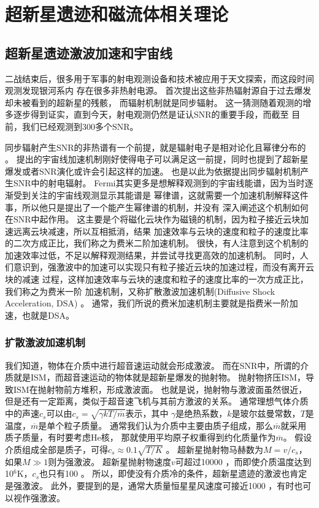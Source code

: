 \chapter{超新星遗迹和磁流体相关理论}
\label{Theory}

\section{超新星遗迹激波加速和宇宙线}
\label{TheoryDSACR}
二战结束后，很多用于军事的射电观测设备和技术被应用于天文探索，而这段时间观测发现银河系内
存在很多非热射电源。
\citet{1953AZh....30...15S}首次提出这些非热辐射源自于过去爆发却未被看到的超新星的残骸，
而辐射机制就是同步辐射。
这一猜测随着观测的增多逐步得到证实，直到今天，射电观测仍然是证认SNR的重要手段，而截至
目前，我们已经观测到300多个SNR\citep{2014BASI...42...47G}。

同步辐射产生SNR的非热谱有一个前提，就是辐射电子是相对论化且幂律分布的
\citep{1970ranp.book.....P}。
\citet{Fermi1949}提出的宇宙线加速机制刚好使得电子可以满足这一前提，同时也提到了超新星
爆发或者SNR演化或许会引起这样的加速。
\citet{1953AZh....30...15S}也是以此为依据提出同步辐射机制产生SNR中的射电辐射。
Fermi其实更多是想解释观测到的宇宙线能谱，因为当时逐渐受到关注的宇宙线观测显示其能谱是
幂律谱，这就需要一个加速机制解释这件事，所以他只是提出了一个能产生幂律谱的机制，并没有
深入阐述这个机制如何在SNR中起作用。
这主要是个将磁化云块作为磁镜的机制，因为粒子接近云块加速远离云块减速，所以互相抵消，结果
加速效率与云块的速度和粒子的速度比率的二次方成正比，我们称之为费米二阶加速机制。
很快，有人注意到这个机制的加速效率过低，不足以解释观测结果，并尝试寻找更高效的加速机制。
同时，人们意识到，强激波中的加速可以实现只有粒子接近云块的加速过程，而没有离开云块的减速
过程，这样加速效率与云块的速度和粒子的速度比率的一次方成正比，我们称之为费米一阶
加速机制，又称扩散激波加速机制(Diffusive Shock Acceleration, DSA)
\citep{1977ICRC...11..132A,1977SPhD...22..327K,Bell1978,Blandford1978}。
通常，我们所说的费米加速机制主要就是指费米一阶加速，也就是DSA。

\subsection{扩散激波加速机制}
我们知道，物体在介质中进行超音速运动就会形成激波。
而在SNR中，所谓的介质就是ISM，而超音速运动的物体就是超新星爆发的抛射物。
抛射物挤压ISM，导致ISM在抛射物前方堆积，形成激波面。
也就是说，抛射物与激波面虽然很近，但是还有一定距离，类似于超音速飞机与其前方激波的关系。
通常理想气体介质中的声速$c_s$可以由$c_s=\sqrt{\gamma kT/\overline{m}}$表示，其中
$\gamma$是绝热系数，$k$是玻尔兹曼常数，$T$是温度，$\overline{m}$是单个粒子质量。
通常我们认为介质中主要由质子组成，那么$\overline{m}$就采用质子质量，有时要考虑He核，
那就使用平均原子权重得到约化质量作为$\overline{m}$。
假设介质组成全部是质子，可得$c_s\approx 0.1\sqrt{T/K}$ \kms 。
超新星抛射物马赫数为$M=v/c_s$，如果$M\gg 1$则为强激波。
超新星抛射物速度$v$可超过10000 \kms ，而即使介质温度达到10$^6$K，$c_s$也只有100 \kms 。
所以，即使没有介质冷的条件，超新星遗迹的激波也肯定是强激波。
此外，要提到的是，通常大质量恒星星风速度可接近1000 \kms，有时也可以视作强激波。

